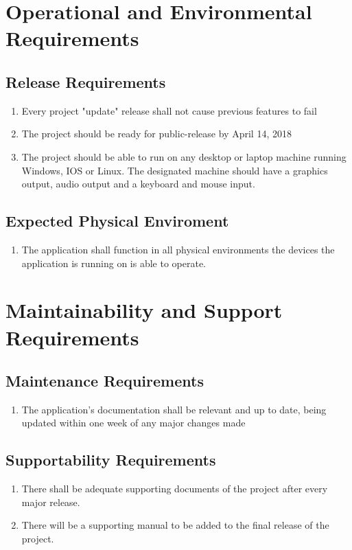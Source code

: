\documentclass{article}
\begin{document}
\section{Operational and Environmental Requirements}
\subsection{Release Requirements}
\begin{enumerate}[{RR}1. ]
	\item Every project "update" release shall not cause previous features to fail
	\item The project should be ready for public-release by April  14, 2018
	\item The project should be able to run on any desktop or laptop machine running Windows, IOS or Linux. The designated machine should have a graphics output, audio output and a keyboard and mouse input.
\end{enumerate}
\subsection{Expected Physical Enviroment}
\begin{enumerate}[{EPE}1. ]
	\item The application shall function in all physical environments the devices the application is running on is able to operate.
\end{enumerate}
\section{Maintainability and Support Requirements}
\subsection{Maintenance Requirements}
\begin{enumerate}[{MR}1. ]
	\item The application's documentation shall be relevant and up to date, being updated within one week of any major changes made
\end{enumerate}
\subsection{Supportability Requirements}
\begin{enumerate}[{SUPR}1. ]
	\item There shall be adequate supporting documents of the project after every major release.
	\item There will be a supporting manual to be added to the final release of the project.
\end{enumerate}
\end{document}
